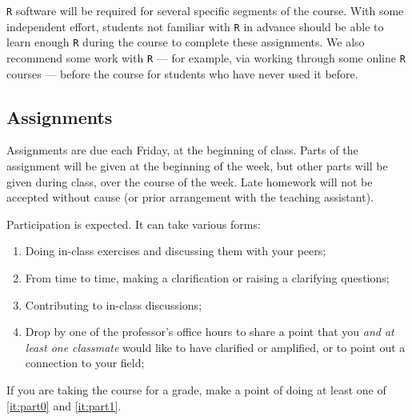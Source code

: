 \documentclass[12pt]{article}
\begin{document}
\begin{verse}  \end{verse}

\texttt{R} software will be required for several specific segments of the course. With some independent effort, students not familiar with \texttt{R} in advance should be able to learn enough \texttt{R} during the course to complete these assignments. We also recommend some work with \texttt{R} --- for example, via working through some online \texttt{R} courses --- before the course for students who have never used it before.

\subsection*{Assignments}
Assignments are due each Friday, at the beginning of
class. Parts of the assignment will be given at the beginning of the week, but other parts will be given during class, over the course of the week.  Late homework will not be accepted without cause (or prior arrangement with the teaching assistant).

Participation is expected. It can take various forms:
\begin{enumerate}
\item Doing in-class exercises and discussing them with your peers;
\item From time to time, making a clarification or raising a clarifying questions;
\item \label{it:part0} Contributing to in-class discussions;
\item \label{it:part1} Drop by one of the professor's office hours to share a point that you \textit{and at least one classmate} would like to have clarified or amplified, or to point out a connection to your field;
\end{enumerate}
If you are taking the course for a grade, make a point of doing at
least one of \ref{it:part0} and \ref{it:part1}. %
\end{document}
